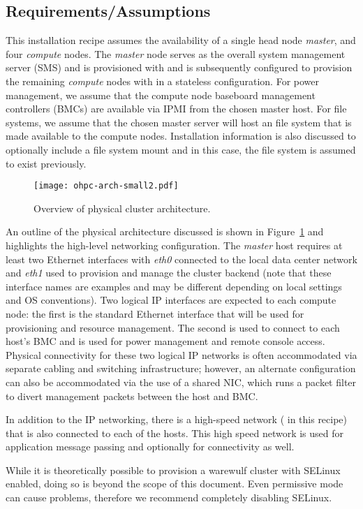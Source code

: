 \subsection{Requirements/Assumptions}
This installation recipe assumes the availability of a single head node {\em
  master}, and four {\em compute} nodes. The {\em master} node serves as the
overall system management server (SMS) and is provisioned with \baseOS{} and is
subsequently configured to provision the remaining {\em compute} nodes with
\Warewulf{} in a stateless configuration. For power management, we assume that
the compute node baseboard management controllers (BMCs) are available via IPMI
from the chosen master host. For file systems, we assume that the chosen master
server will host an \NFS{} file system that is made available to the compute
nodes. Installation information is also discussed to optionally include a
\Lustre{} file system mount and in this case, the \Lustre{} file system is
assumed to exist previously.

\begin{figure}[hbt]
\center
\texttt{[image: ohpc-arch-small2.pdf]}
\vspace*{-0.2cm}
\caption{Overview of physical cluster architecture.} \label{fig:physical_arch}
\end{figure}
\mbox{}

An outline of the physical architecture discussed is shown in
Figure~\ref{fig:physical_arch} and highlights the high-level networking
configuration. The {\em master} host requires at least two Ethernet interfaces
with {\em eth0} connected to the local data center network and {\em eth1} used
to provision and manage the cluster backend (note that these interface names
are examples and may be different depending on local settings and OS
conventions).  Two logical IP interfaces are expected to each compute node: the
first is the standard Ethernet interface that will be used for provisioning and
resource management. The second is used to connect to each host's BMC and is
used for power management and remote console access. Physical connectivity for
these two logical IP networks is often accommodated via separate cabling and
switching infrastructure; however, an alternate configuration can also be
accommodated via the use of a shared NIC, which runs a packet filter to divert
management packets between the host and BMC.

 In addition to the IP networking, there is a high-speed network
(\InfiniBand{} in this recipe) that is also connected to each of the
hosts. This high speed network is used for application message passing and
optionally for \Lustre{} connectivity as well.

\begin{center}
\begin{tcolorbox}[]
\small
While it is theoretically possible to provision a warewulf cluster with SELinux
enabled, doing so is beyond the scope of this document. Even permissive mode can
cause problems, therefore we recommend completely disabling SELinux.

\end{tcolorbox}
\end{center}
